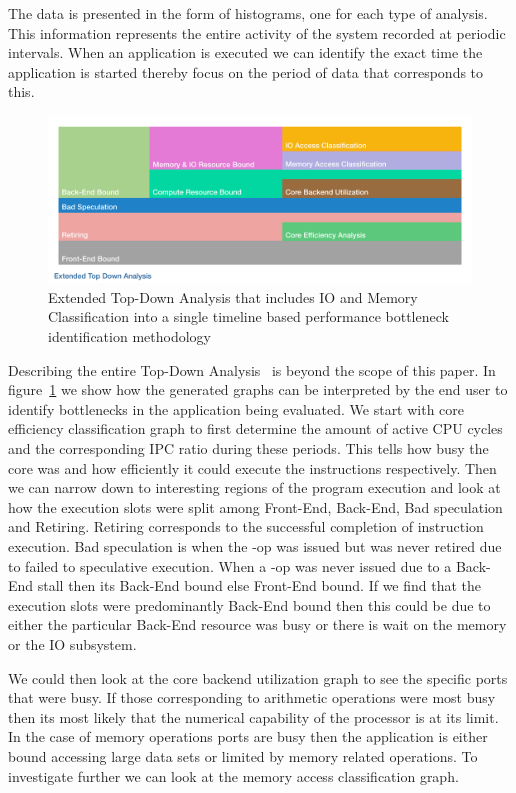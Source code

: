 \documentclass{webofc}
\begin{document}
The data is presented in the form of histograms, one for each type of analysis. This information represents the entire activity of the system recorded at periodic intervals. When an application is executed we can identify the exact time the application is started thereby focus on the period of data that corresponds to this.

\begin{figure}
  \centering
	\captionsetup{justification=centering}
  \includegraphics[width=0.7\linewidth]{ExtendedTopDownDiag.pdf}
\caption{Extended Top-Down Analysis that includes IO and Memory Classification into a single timeline based performance bottleneck identification methodology}
\label{fig:ext_top_down}
\end{figure}

Describing the entire Top-Down Analysis~\cite{6844459} is beyond the scope of this paper. In figure~\ref{fig:ext_top_down} we show how the generated graphs can be interpreted by the end user to identify bottlenecks in the application being evaluated. We start with core efficiency classification graph to first determine the amount of active CPU cycles and the corresponding IPC ratio during these periods. This tells how busy the core was and how efficiently it could execute the instructions respectively. Then we can narrow down to interesting regions of the program execution and look at how the execution slots were split among Front-End, Back-End, Bad speculation and Retiring. Retiring corresponds to the successful completion of instruction execution. Bad speculation is when the \textmu-op was issued but was never retired due to failed to speculative execution. When a \textmu-op was never issued due to a Back-End stall then its Back-End bound else Front-End bound. If we find that the execution slots were predominantly Back-End bound then this could be due to either the particular Back-End resource was busy or there is wait on the memory or the IO subsystem.

We could then look at the core backend utilization graph to see the specific ports that were busy. If those corresponding to arithmetic operations were most busy then its most likely that the numerical capability of the processor is at its limit. In the case of memory operations ports are busy then the application is either bound accessing large data sets or limited by memory related operations. To investigate further we can look at the memory access classification graph.
\end{document}
